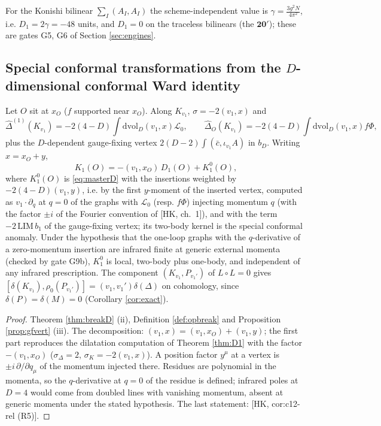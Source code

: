 \begin{remark}
For the Konishi bilinear $\sum_I(A_I,A_I)$ the scheme-independent value is $\gamma=\frac{3g^2N}{4\pi^2}$, i.e. $D_1=2\gamma=-48$ units, and $D_1=0$ on the traceless bilinears (the $\mathbf{20}'$); these are gates G5, G6 of Section \ref{sec:engines}.
\end{remark}

\subsection{Special conformal transformations from the \texorpdfstring{$D$}{D}-dimensional conformal Ward identity}

\begin{theorem}[$K_1$ in DR]
\label{thm:K1}
Let $O$ sit at $x_O$ ($f$ supported near $x_O$). Along $K_{v_1}$, $\sigma=-2(v_1,x)$ and
\[
\widehat\Delta^{(1)}(K_{v_1})=-2(4-D)\int\mathrm{dvol}_D(v_1,x)\mathscr L_0,\qquad \widehat\Delta_O(K_{v_1})=-2(4-D)\int\mathrm{dvol}_D(v_1,x)f\Phi,
\]
plus the $D$-dependent gauge-fixing vertex $2(D-2)\int(\bar c,\iota_{v_1}A)$ in $b_D$. Writing $x=x_O+y$,
\[
K_1(O)=-(v_1,x_O)\,D_1(O)+K^0_1(O),
\]
where $K^0_1(O)$ is \eqref{eq:masterD} with the insertions weighted by $-2(4-D)(v_1,y)$, i.e. by the first $y$-moment of the inserted vertex, computed as $v_1\cdot\partial_q$ at $q=0$ of the graphs with $\mathscr L_0$ (resp. $f\Phi$) injecting momentum $q$ (with the factor $\pm i$ of the Fourier convention of [HK, ch.~1]), and with the term $-2\,\mathrm{LIM}\,b_1$ of the gauge-fixing vertex; its two-body kernel is the special conformal anomaly. Under the hypothesis that the one-loop graphs with the $q$-derivative of a zero-momentum insertion are infrared finite at generic external momenta (checked by gate G9b), $K^0_1$ is local, two-body plus one-body, and independent of any infrared prescription. The component $(K_{v_1},P_{v_1'})$ of $L\circ L=0$ gives $[\delta(K_{v_1}),\rho_0(P_{v_1'})]=(v_1,v_1')\delta(\Delta)$ on cohomology, since $\delta(P)=\delta(M)=0$ (Corollary \ref{cor:exact}).
\end{theorem}

\begin{proof}
Theorem \ref{thm:breakD} (ii), Definition \ref{def:opbreak} and Proposition \ref{prop:gfvert} (iii). The decomposition: $(v_1,x)=(v_1,x_O)+(v_1,y)$; the first part reproduces the dilatation computation of Theorem \ref{thm:D1} with the factor $-(v_1,x_O)$ ($\sigma_\Delta=2$, $\sigma_K=-2(v_1,x)$). A position factor $y^\mu$ at a vertex is $\pm i\,\partial/\partial q_\mu$ of the momentum injected there. Residues are polynomial in the momenta, so the $q$-derivative at $q=0$ of the residue is defined; infrared poles at $D=4$ would come from doubled lines with vanishing momentum, absent at generic momenta under the stated hypothesis. The last statement: [HK, cor:c12-rel (R5)].
\end{proof}

